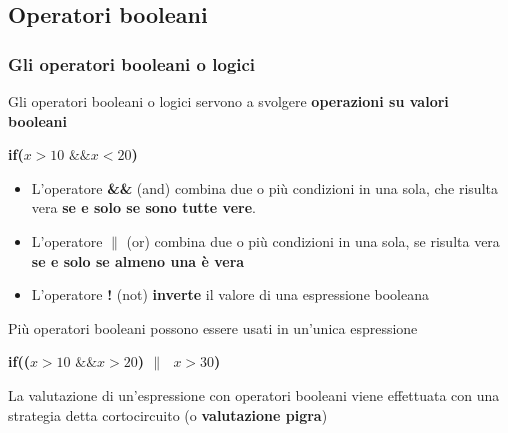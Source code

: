 \subsection*{Operatori booleani}
\begin{frame}
\frametitle{Gli operatori booleani o logici}
\begin{block}{}
Gli operatori booleani o logici servono a svolgere \textbf{\alert{operazioni su valori booleani}}
\end{block}
\hspace{0.7cm}\textbf{if($x > 10 \mbox{ \&\& } x < 20$)} 
\begin{block}{}
\begin{itemize}
\item L'operatore \textbf{\&\&} (and) combina due o più condizioni in una sola, che risulta vera \textbf{\alert{se e solo se sono tutte 
vere}}.
\item L'operatore \textbf{$\|$} (or) combina due o più condizioni in una sola, se risulta vera \textbf{\alert{se e solo se almeno 
una è vera}}
\item L'operatore \textbf{!} (not) \textbf{\alert{inverte}} il valore di una espressione booleana
\end{itemize}
\end{block}
\end{frame}

\begin{frame}
\begin{block}{}
Più operatori booleani possono essere usati in un'unica espressione
\end{block}
\hspace{0.7cm}\textbf{if(($x > 10 \mbox{ \&\& } x > 20$) $\| \mbox{ } x > 30$)}
\begin{block}{}
La valutazione di un'espressione con operatori booleani viene effettuata con una strategia detta cortocircuito (o 
\textbf{valutazione pigra})
\end{block}
\end{frame}


